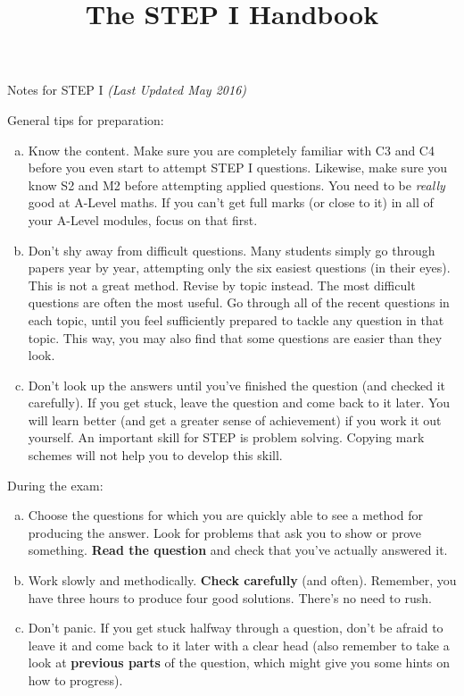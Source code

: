 \documentclass[9pt]{extarticle}
\title{The STEP I Handbook}
\date{\vspace{-12ex}}
\begin{document}
	
	\thispagestyle{empty}
	
	{\huge Notes for STEP I} \hfill \emph{(Last Updated May 2016)}
	
	General tips for preparation:
	\begin{enumerate}[(a)]
		\item Know the content. Make sure you are completely familiar with C3 and C4 before you even start to attempt STEP I questions. Likewise, make sure you know S2 and M2 before attempting applied questions. You need to be \emph{really} good at A-Level maths. If you can't get full marks (or close to it) in all of your A-Level modules, focus on that first.
		\item Don't shy away from difficult questions. Many students simply go through papers year by year, attempting only the six easiest questions (in their eyes). This is not a great method. Revise by topic instead. The most difficult questions are often the most useful. Go through all of the recent questions in each topic, until you feel sufficiently prepared to tackle any question in that topic. This way, you may also find that some questions are easier than they look.
		\item Don't look up the answers until you've finished the question (and checked it carefully). If you get stuck, leave the question and come back to it later. You will learn better (and get a greater sense of achievement) if you work it out yourself. An important skill for STEP is problem solving. Copying mark schemes will not help you to develop this skill.
	\end{enumerate}
	
	During the exam:
	\begin{enumerate}[(a)]
		\item Choose the questions for which you are quickly able to see a method for producing the answer. Look for problems that ask you to show or prove something. \textbf{Read the question} and check that you've actually answered it.
		\item Work slowly and methodically. \textbf{Check carefully} (and often). Remember, you have three hours to produce four good solutions. There's no need to rush.
		\item Don't panic. If you get stuck halfway through a question, don't be afraid to leave it and come back to it later with a clear head (also remember to take a look at \textbf{previous parts} of the question, which might give you some hints on how to progress).
	\end{enumerate}
	
\end{document}
